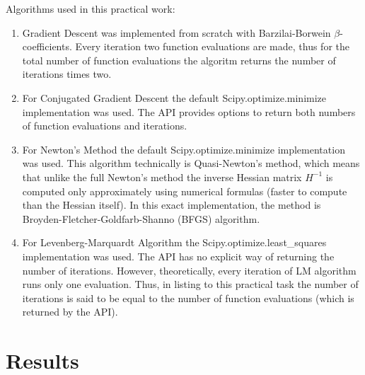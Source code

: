 \documentclass[12pt, a4paper]{article}
\begin{document}
Algorithms used in this practical work:
\begin{enumerate}
	\item Gradient Descent was implemented from scratch with Barzilai-Borwein $\beta$-coefficients. Every iteration two function evaluations are made, thus for the total number of function evaluations the algoritm returns the number of iterations times two.
	\item For Conjugated Gradient Descent the default Scipy.optimize.minimize implementation was used. The API provides options to return both numbers of function evaluations and iterations.
	\item For Newton's Method the default Scipy.optimize.minimize implementation was used. This algorithm technically is Quasi-Newton's method, which means that unlike the full Newton's method the inverse Hessian matrix $H^{-1}$ is computed only approximately using numerical formulas (faster to compute than the Hessian itself). In this exact implementation, the method is Broyden-Fletcher-Goldfarb-Shanno (BFGS) algorithm.
	\item For Levenberg-Marquardt Algorithm the Scipy.optimize.least\_squares implementation was used. The API has no explicit way of returning the number of iterations. However, theoretically, every iteration of LM algorithm runs only one evaluation. Thus, in listing to this practical task the number of iterations is said to be equal to the number of function evaluations (which is returned by the API).
\end{enumerate}

\newpage

\section*{Results}
\end{document}
